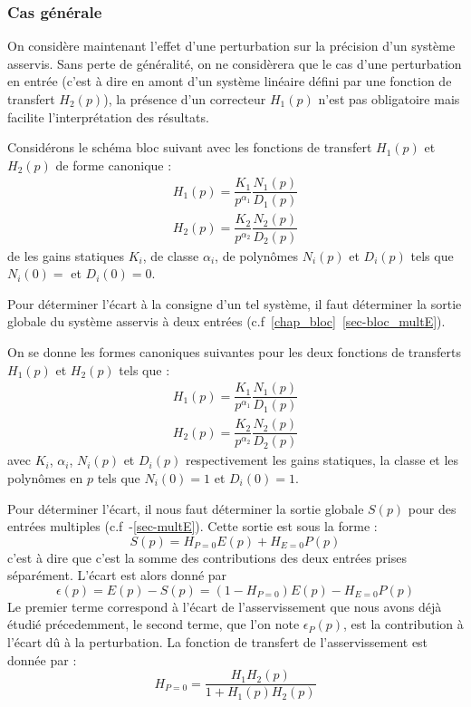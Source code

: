\subsubsection{Cas générale}
On considère maintenant l'effet d'une perturbation sur la précision d'un 
système asservis.
Sans perte de généralité, on ne considèrera que le cas d'une perturbation 
en entrée (c'est à dire en amont d'un système linéaire défini par une fonction 
de transfert $H_2(p)$), la présence d'un correcteur $H_1(p)$ n'est pas 
obligatoire mais facilite l'interprétation des résultats.

Considérons le schéma bloc suivant avec les fonctions de transfert $H_1(p)$ 
et $H_2(p)$ de forme canonique :
\begin{align*}
    H_1(p)=\dfrac{K_1}{p^{\alpha_1}}\dfrac{N_1(p)}{D_1(p)} \\
    H_2(p)=\dfrac{K_2}{p^{\alpha_2}}\dfrac{N_2(p)}{D_2(p)}
\end{align*}
de les gains statiques $K_i$, de classe $\alpha_i$, de polynômes $N_i(p)$
et $D_i(p)$ tels que $N_i(0)=$ et $D_i(0)=0$.
\begin{center}
    
\end{center}
Pour déterminer l'écart à la consigne d'un tel système, il faut déterminer
la sortie globale du système asservis à deux entrées 
(c.f~\cref{chap_bloc}~\cref{sec-bloc_multE}).

On se donne les formes canoniques suivantes pour les deux fonctions de 
transferts $H_1(p)$ et $H_2(p)$ tels que :
\begin{align*}
H_1(p)=\dfrac{K_1}{p^{\alpha_1}}\dfrac{N_1(p)}{D_1(p)}\\
H_2(p)=\dfrac{K_2}{p^{\alpha_2}}\dfrac{N_2(p)}{D_2(p)}
\end{align*}
avec $K_i$, $\alpha_i$, $N_i(p)$ et $D_i(p)$ respectivement les gains statiques,
la classe et les polynômes en $p$ tels que $N_i(0)=1$ et $D_i(0)=1$.

Pour déterminer l'écart, il nous faut déterminer la sortie globale $S(p)$ pour
des entrées multiples (c.f~-\cref{sec-multE}).
Cette sortie est sous la forme :
$$
S(p)=H_{P=0}E(p)+H_{E=0}P(p)
$$
c'est à dire que c'est la somme des contributions des deux entrées prises
séparément.
L'écart est alors donné par 
$$
\epsilon(p)=E(p)-S(p)=\left(1-H_{P=0}\right)E(p)-H_{E=0}P(p)
$$
Le premier terme correspond à l'écart de l'asservissement que nous avons 
déjà étudié précedemment, le second terme, que l'on note $\epsilon_P(p)$, 
est la contribution à l'écart dû à la perturbation.
La fonction de transfert de l'asservissement est donnée par :
$$
H_{P=0}=\dfrac{H_1H_2(p)}{1+H_1(p)H_2(p)} 
$$

